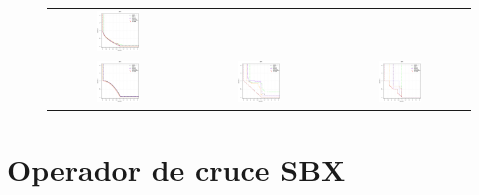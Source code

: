 \begin{figure}[H]
\begin{tabular}{ccc}
  \includegraphics[width=0.33\textwidth]{Figures_Chapter7/Results_Chapter4/Surface_Representative/UF3.eps} \\
  \includegraphics[width=0.33\textwidth]{Figures_Chapter7/Results_Chapter4/Surface_Representative/UF4.eps} &
  \includegraphics[width=0.33\textwidth]{Figures_Chapter7/Results_Chapter4/Surface_Representative/UF5.eps} &
  \includegraphics[width=0.33\textwidth]{Figures_Chapter7/Results_Chapter4/Surface_Representative/UF6.eps} 
\end{tabular}
\end{figure}






\section{Operador de cruce SBX}

